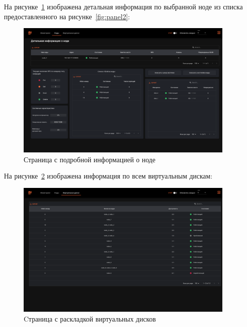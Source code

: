 \clearpage

На рисунке~\ref{fig:detailed_panel} изображена детальная информация по выбранной ноде из
списка предоставленного на рисунке~\ref{fig:panel2}:

\begin{figure}[!htbp]
  \begin{center}
    \includegraphics[width=0.95\textwidth]{inc/detailed_panel.png}
  \end{center}
  \caption{Страница с подробной информацией о ноде}\label{fig:detailed_panel}
\end{figure}

\clearpage

На рисунке~\ref{fig:panel3} изображена информация по всем виртуальным дискам:

\begin{figure}[!htbp]
  \begin{center}
    \includegraphics[width=0.95\textwidth]{inc/panel3.png}
  \end{center}
  \caption{Cтраница с раскладкой виртуальных дисков}\label{fig:panel3}
\end{figure}


